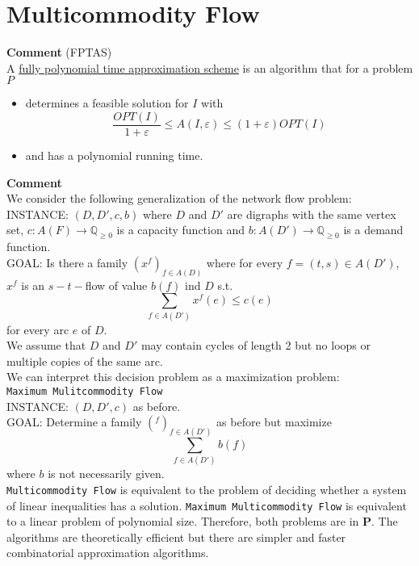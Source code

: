 \documentclass[a4paper, 12pt]{article}
\begin{document}
	\section{Multicommodity Flow}
	\textbf{Comment} (FPTAS)\\
	A \underline{fully polynomial time approximation scheme} is an algorithm that for a problem $P$ \begin{itemize}
		\item determines a feasible solution for $I$ with \[\frac{OPT(I)}{1+\varepsilon} \leq A(I,\varepsilon) \leq (1+\varepsilon)OPT(I)\]
		\item and has a polynomial running time.
	\end{itemize}
	\textbf{Comment}\\
	We consider the following generalization of the network flow problem:\\
	INSTANCE: $(D,D',c,b)$ where $D$ and $D'$ are digraphs with the same vertex set, $c:A(F) \to \mathbb{Q}_{\geq 0}$ is a capacity function and $b: A(D') \to \mathbb{Q}_{\geq 0}$ is a demand function.\\
	GOAL: Is there a family $(x^f)_{f \in A(D)}$ where for every $f = (t,s) \in A(D')$, $x^f$ is an $s-t-$flow of value $b(f)$ ind $D$ s.t. \[\sum_{f \in A(D')}x^f(e) \leq c(e)\] for every arc $e$ of $D$.\\
	We assume that $D$ and $D'$ may contain cycles of length 2 but no loops or multiple copies of the same arc.\\
	We can interpret this decision problem as a maximization problem:\\
	\texttt{Maximum Mulitcommodity Flow}\\
	INSTANCE: $(D,D',c)$ as before.\\
	GOAL: Determine a family $(^f)_{f \in A(D')}$ as before but maximize \[\sum_{f \in A(D')}b(f)\] where $b$ is not necessarily given.\\
	\texttt{Multicommodity Flow} is equivalent to the problem of deciding whether a system of linear inequalities has a solution. \texttt{Maximum Multicommodity Flow} is equivalent to a linear problem of polynomial size. Therefore, both problems are in \textbf{P}. The algorithms are theoretically efficient but there are simpler and faster combinatorial approximation algorithms.\\
	
\end{document}
